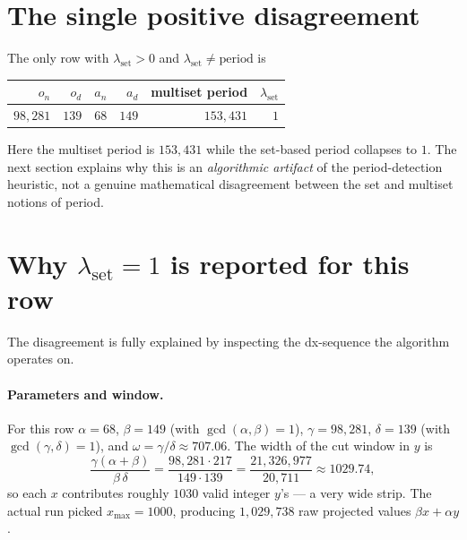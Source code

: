 \documentclass[11pt]{article}
\begin{document}
\section*{The single positive disagreement}

The only row with $\lambda_{\text{set}} > 0$ and
$\lambda_{\text{set}} \neq \mathrm{period}$ is

\begin{center}
\begin{tabular}{rrrrrr}
\toprule
$o_n$ & $o_d$ & $a_n$ & $a_d$ & multiset period & $\lambda_{\text{set}}$ \\
\midrule
$98{,}281$ & $139$ & $68$ & $149$ & $153{,}431$ & $1$ \\
\bottomrule
\end{tabular}
\end{center}

Here the multiset period is $153{,}431$ while the set-based period
collapses to $1$. The next section explains why this is an
\emph{algorithmic artifact} of the period-detection heuristic, not a
genuine mathematical disagreement between the set and multiset notions
of period.

\section*{Why $\lambda_{\text{set}} = 1$ is reported for this row}

The disagreement is fully explained by inspecting the dx-sequence the
algorithm operates on.

\paragraph{Parameters and window.}
For this row $\alpha = 68$, $\beta = 149$ (with $\gcd(\alpha,\beta)=1$),
$\gamma = 98{,}281$, $\delta = 139$ (with $\gcd(\gamma,\delta)=1$), and
$\omega = \gamma/\delta \approx 707.06$. The width of the cut window in
$y$ is
\[
\frac{\gamma(\alpha+\beta)}{\beta\,\delta}
= \frac{98{,}281 \cdot 217}{149 \cdot 139}
= \frac{21{,}326{,}977}{20{,}711} \approx 1029.74,
\]
so each $x$ contributes roughly $1030$ valid integer $y$'s — a very wide
strip. The actual run picked $x_{\max} = 1000$, producing $1{,}029{,}738$
raw projected values $\beta x + \alpha y$.
\end{document}
